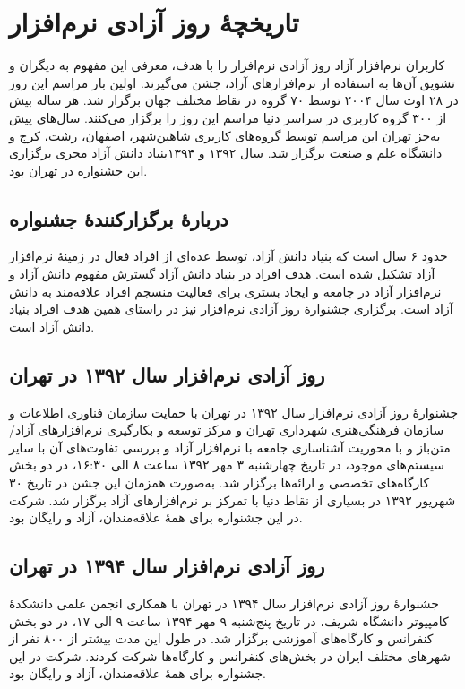 \documentclass{article}
\begin{document}
\section{تاریخچهٔ روز آزادی نرم‌افزار}
کاربران نرم‌افزار آزاد روز آزادی نرم‌افزار را با هدف، معرفی این مفهوم به دیگران و تشویق آن‌ها به استفاده از نرم‌افزارهای آزاد، جشن می‌گیرند.
اولین بار مراسم این روز در ۲۸ اوت سال ۲۰۰۴ توسط ۷۰ گروه در نقاط مختلف جهان برگزار شد. هر ساله بیش از ۳۰۰ گروه کاربری در سراسر دنیا مراسم این روز را برگزار می‌کنند. سال‌های پیش به‌جز تهران این مراسم توسط گروه‌های کاربری شاهین‌شهر، اصفهان، رشت، کرج و دانشگاه علم و صنعت برگزار شد. سال ۱۳۹۲ و ۱۳۹۴بنیاد دانش آزاد مجری برگزاری این جشنواره در تهران بود.
\subsection{دربارهٔ برگزارکنندهٔ جشنواره}
 حدود ۶ سال است که بنیاد دانش آزاد، توسط عده‌ای از افراد فعال در زمینهٔ نرم‌افزار آزاد تشکیل شده است. هدف افراد در بنیاد دانش آزاد گسترش مفهوم دانش آزاد  و نرم‌افزار آزاد در جامعه و ایجاد بستری برای فعالیت منسجم افراد علاقه‌مند به دانش آزاد است. برگزاری جشنوارهٔ روز آزادی نرم‌افزار نیز در راستای همین هدف افراد بنیاد دانش آزاد است.
\subsection{روز آزادی نرم‌افزار سال ۱۳۹۲ در تهران}
جشنوارهٔ روز آزادی نرم‌افزار سال ۱۳۹۲ در تهران با حمایت سازمان فناوری اطلاعات و سازمان فرهنگی‌هنری شهرداری تهران و مرکز توسعه و بکارگیری نرم‌افزارهای آزاد/متن‌باز و با محوریت آشناسازی جامعه با نرم‌افزار آزاد و بررسی تفاوت‌های آن با سایر سیستم‌های موجود، در تاریخ چهارشنبه ۳ مهر ۱۳۹۲ ساعت ۸ الی ۱۶:۳۰، در دو بخش کارگاه‌های تخصصی و ارائه‌ها برگزار شد. به‌صورت همزمان این جشن در تاریخ ۳۰ شهریور ۱۳۹۲  در بسیاری از نقاط دنیا با تمرکز بر نرم‌افزارهای آزاد برگزار شد. شرکت در این جشنواره برای همهٔ علاقه‌مندان، آزاد و رایگان بود.

\subsection{روز آزادی نرم‌افزار سال ۱۳۹۴ در تهران}
جشنوارهٔ روز آزادی نرم‌افزار سال ۱۳۹۴ در تهران با همکاری انجمن علمی دانشکدهٔ کامپیوتر دانشگاه شریف، در تاریخ پنج‌شنبه ۹ مهر ۱۳۹۴ ساعت ۹ الی ۱۷، در دو بخش کنفرانس و کارگاه‌های آموزشی برگزار شد. در طول این مدت بیشتر از ۸۰۰ نفر از شهرهای مختلف ایران در بخش‌های کنفرانس و کارگاه‌ها شرکت کردند. شرکت در این جشنواره برای همهٔ علاقه‌مندان، آزاد و رایگان بود.
\end{document}
